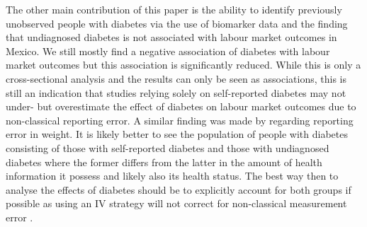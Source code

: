 The other main contribution of this paper is the ability to identify previously unobserved people with diabetes via the use of biomarker data and the finding that undiagnosed
diabetes is not associated with labour market outcomes in Mexico. We still mostly find a negative association of diabetes with labour market outcomes but this association is significantly reduced. While this is only a cross-sectional analysis and the results can only be seen as associations, this is still an indication that studies relying solely on self-reported diabetes may not under- but overestimate the effect of diabetes on labour market outcomes due to non-classical reporting error. A similar finding was made by \citet{Cawley2015} regarding reporting error in weight. It is likely better to see the population of people with diabetes consisting of those with self-reported diabetes and those with undiagnosed diabetes where the former differs from the latter in the amount of health information it possess and likely also its health status. The best way then to analyse the effects of diabetes should be to explicitly account for both groups if possible as using an \ac{IV} strategy will not correct for non-classical measurement error \citep{Cawley2015}.


  
  
